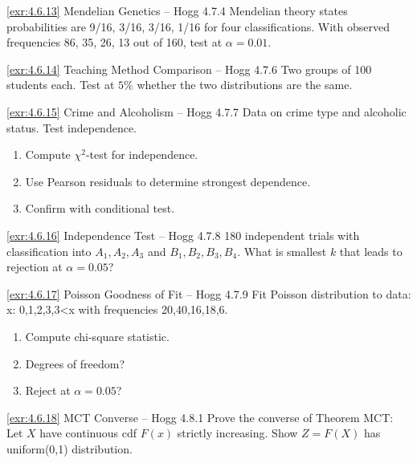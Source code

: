 \begin{exercise}{\ref{exr:4.6.13} Mendelian Genetics – Hogg 4.7.4}\label{exr:4.6.13}
Mendelian theory states probabilities are 9/16, 3/16, 3/16, 1/16 for four classifications. With observed frequencies 86, 35, 26, 13 out of 160, test at $\alpha=0.01$.
\end{exercise}

\begin{exercise}{\ref{exr:4.6.14} Teaching Method Comparison – Hogg 4.7.6}\label{exr:4.6.14}
Two groups of 100 students each. Test at $5\%$ whether the two distributions are the same.
\end{exercise}

\begin{exercise}{\ref{exr:4.6.15} Crime and Alcoholism – Hogg 4.7.7}\label{exr:4.6.15}
Data on crime type and alcoholic status. Test independence.
\begin{enumerate}
\item[(a)] Compute $\chi^2$-test for independence.
\item[(b)] Use Pearson residuals to determine strongest dependence.
\item[(c)] Confirm with conditional test.
\end{enumerate}
\end{exercise}

\begin{exercise}{\ref{exr:4.6.16} Independence Test – Hogg 4.7.8}\label{exr:4.6.16}
180 independent trials with classification into $A_1,A_2,A_3$ and $B_1,B_2,B_3,B_4$. What is smallest $k$ that leads to rejection at $\alpha=0.05$?
\end{exercise}

\begin{exercise}{\ref{exr:4.6.17} Poisson Goodness of Fit – Hogg 4.7.9}\label{exr:4.6.17}
Fit Poisson distribution to data: x: 0,1,2,3,3<x with frequencies 20,40,16,18,6.
\begin{enumerate}
\item[(a)] Compute chi-square statistic.
\item[(b)] Degrees of freedom?
\item[(c)] Reject at $\alpha=0.05$?
\end{enumerate}
\end{exercise}

\begin{exercise}{\ref{exr:4.6.18} MCT Converse – Hogg 4.8.1}\label{exr:4.6.18}
Prove the converse of Theorem MCT: Let $X$ have continuous cdf $F(x)$ strictly increasing. Show $Z=F(X)$ has uniform(0,1) distribution.
\end{exercise}

